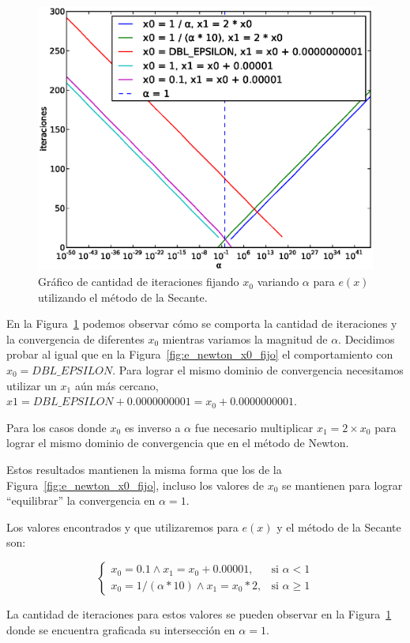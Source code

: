 \begin{figure}[!htbp]
  \begin{center}
    \includegraphics[scale=0.5]{graficos/new/e_secante_x0_fijo.eps}
    \caption{\label{fig:e_secante_x0_fijo} Gráfico de cantidad de iteraciones fijando $x_0$ variando $\alpha$ para $e(x)$ utilizando el método de la Secante.}
  \end{center}
\end{figure}

En la Figura~\ref{fig:e_secante_x0_fijo} podemos observar cómo se comporta la
cantidad de iteraciones y la convergencia de diferentes $x_0$ mientras variamos
la magnitud de $\alpha$. Decidimos probar al igual que en la
Figura~\ref{fig:e_newton_x0_fijo} el comportamiento con $x_0 =
\textit{DBL\_EPSILON}$. Para lograr el mismo dominio de convergencia
necesitamos utilizar un $x_1$ aún más cercano,  $x1 = \textit{DBL\_EPSILON} +
0.0000000001 = x_0 + 0.0000000001$.

Para los casos donde $x_0$ es inverso a $\alpha$ fue necesario multiplicar $x_1
= 2 \times x_0$ para lograr el mismo dominio de convergencia que en el método
de Newton.

Estos resultados mantienen la misma forma que los de la
Figura~\ref{fig:e_newton_x0_fijo}, incluso los valores de $x_0$ se mantienen
para lograr ``equilibrar'' la convergencia en $\alpha = 1$.

Los valores encontrados y que utilizaremos para $e(x)$ y el método de la
Secante son:

\[
\begin{cases}
x_0 = 0.1 \wedge x_1 = x_0 + 0.00001, & \mbox{si } \alpha < 1\\
x_0 = 1 / (\alpha * 10) \wedge x_1 = x_0 * 2, & \mbox{si } \alpha \ge 1
\end{cases}
\]

La cantidad de iteraciones para estos valores se pueden observar en la
Figura~\ref{fig:e_secante_x0_fijo} donde se encuentra graficada su intersección
en $\alpha = 1$.
